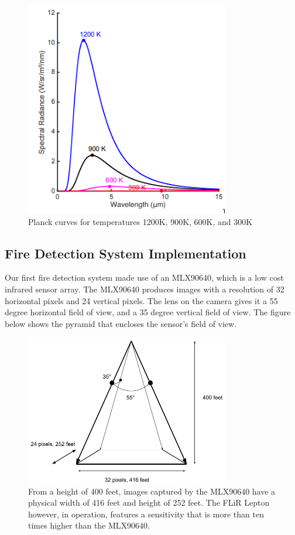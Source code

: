 \documentclass[12pt,journal,compsoc]{IEEEtran}
\begin{document}
\begin{figure}[h]
\centering
\includegraphics[width=3.5in]{planckb.png}
\caption{Planck curves for temperatures 1200K, 900K, 600K, and 300K}
\label{planckb_image}
\end{figure}


\subsection{Fire Detection System Implementation}
Our first fire detection system made use of an MLX90640, which is a low cost infrared sensor array. The MLX90640
produces images with a resolution of 32 horizontal pixels and 24 vertical pixels. The lens on the camera 
gives it a 55 degree horizontal field of view, and a 35 degree vertical field of view. The figure below
shows the pyramid that encloses the sensor's field of view. 

\begin{figure}[h]
\centering
\includegraphics[width=3.5in]{mlx90640_fov.png}
\caption{From a height of 400 feet, images captured by the MLX90640 have a physical width of 416 feet and height of 252 feet. The FLiR Lepton however, in operation, features a sensitivity that is more than ten times higher than the MLX90640.}
\end{figure}
\end{document}

